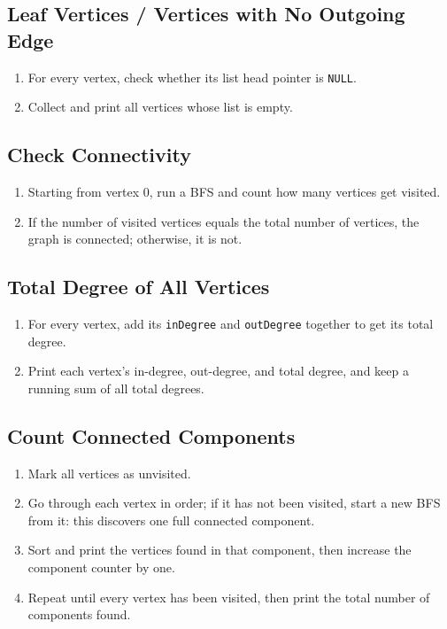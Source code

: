 \documentclass[11pt]{article}
\begin{document}
\subsection{Leaf Vertices / Vertices with No Outgoing Edge}
\begin{enumerate}[topsep=2pt, itemsep=2pt]
  \item For every vertex, check whether its list head pointer is \texttt{NULL}.
  \item Collect and print all vertices whose list is empty.
\end{enumerate}

\subsection{Check Connectivity}
\begin{enumerate}[topsep=2pt, itemsep=2pt]
  \item Starting from vertex 0, run a BFS and count how many vertices get visited.
  \item If the number of visited vertices equals the total number of vertices, the graph is connected; otherwise, it is not.
\end{enumerate}

\subsection{Total Degree of All Vertices}
\begin{enumerate}[topsep=2pt, itemsep=2pt]
  \item For every vertex, add its \texttt{inDegree} and \texttt{outDegree} together to get its total degree.
  \item Print each vertex's in-degree, out-degree, and total degree, and keep a running sum of all total degrees.
\end{enumerate}

\subsection{Count Connected Components}
\begin{enumerate}[topsep=2pt, itemsep=2pt]
  \item Mark all vertices as unvisited.
  \item Go through each vertex in order; if it has not been visited, start a new BFS from it: this discovers one full connected component.
  \item Sort and print the vertices found in that component, then increase the component counter by one.
  \item Repeat until every vertex has been visited, then print the total number of components found.
\end{enumerate}
\end{document}
